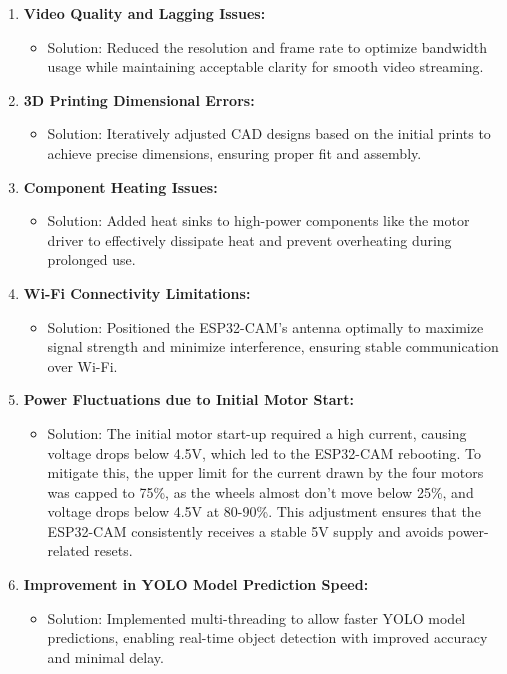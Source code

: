 \documentclass[12pt,a4paper]{report}
\begin{document}
\begin{enumerate}
    \item \textbf{Video Quality and Lagging Issues:} 
    \begin{itemize}
        \item Solution: Reduced the resolution and frame rate to optimize bandwidth usage while maintaining acceptable clarity for smooth video streaming.
    \end{itemize}


    \item \textbf{3D Printing Dimensional Errors:}
    \begin{itemize}
        \item Solution: Iteratively adjusted CAD designs based on the initial prints to achieve precise dimensions, ensuring proper fit and assembly.
    \end{itemize}

    \item \textbf{Component Heating Issues:}
    \begin{itemize}
        \item Solution: Added heat sinks to high-power components like the motor driver to effectively dissipate heat and prevent overheating during prolonged use.
    \end{itemize}

    \item \textbf{Wi-Fi Connectivity Limitations:}
    \begin{itemize}
        \item Solution: Positioned the ESP32-CAM’s antenna optimally to maximize signal strength and minimize interference, ensuring stable communication over Wi-Fi.
    \end{itemize}

    \item \textbf{Power Fluctuations due to Initial Motor Start:}
    \begin{itemize}
        \item Solution: The initial motor start-up required a high current, causing voltage drops below 4.5V, which led to the ESP32-CAM rebooting. To mitigate this, the upper limit for the current drawn by the four motors was capped to 75\%, as the wheels almost don't move below 25\%, and voltage drops below 4.5V at 80-90\%. This adjustment ensures that the ESP32-CAM consistently receives a stable 5V supply and avoids power-related resets.
    \end{itemize}
    
        \item \textbf{Improvement in YOLO Model Prediction Speed:}
    \begin{itemize}
        \item Solution: Implemented multi-threading to allow faster YOLO model predictions, enabling real-time object detection with improved accuracy and minimal delay.
    \end{itemize}
\end{enumerate}
\end{document}
